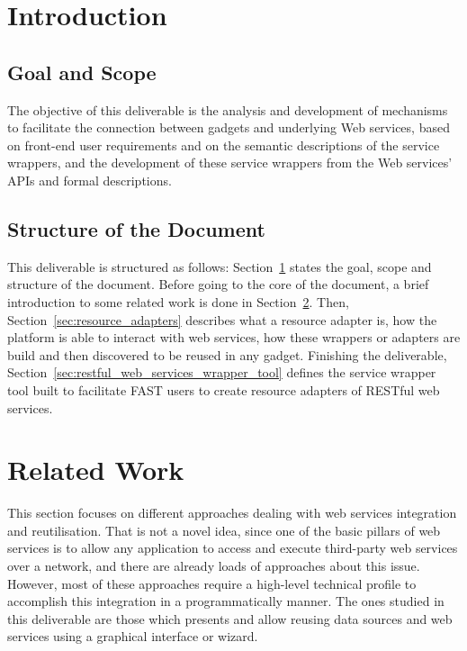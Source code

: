 \documentclass{fast_latex}
\begin{document}
\clearpage

\section{Introduction} %
\label{sec:introduction}

\subsection{Goal and Scope} %
\label{sub:goal_and_scope}

The objective of this deliverable is the analysis and development of mechanisms to facilitate the connection between gadgets and underlying Web services, based on front-end user requirements and on the semantic descriptions of the service wrappers, and the development of these service wrappers from the Web services' APIs and formal descriptions.


\subsection{Structure of the Document} %
\label{sub:structure_of_the_document}

This deliverable is structured as follows: Section~\ref{sec:introduction} states the goal, scope and structure of the document. Before going to the core of the document, a brief introduction to some related work is done in Section~\ref{sec:related_work}. Then, Section~\ref{sec:resource_adapters} describes what a resource adapter is, how the platform is able to interact with web services, how these wrappers or adapters are build and then discovered to be reused in any gadget. Finishing the deliverable, Section~\ref{sec:restful_web_services_wrapper_tool} defines the service wrapper tool built to facilitate FAST users to create resource adapters of RESTful web services.



\clearpage
\section{Related Work} %
\label{sec:related_work}

This section focuses on different approaches dealing with web services integration and reutilisation. That is not a novel idea, since one of the basic pillars of web services is to allow any application to access and execute third-party web services over a network, and there are already loads of approaches about this issue. However, most of these approaches require a high-level technical profile to accomplish this integration in a programmatically manner. The ones studied in this deliverable are those which presents and allow reusing data sources and web services using a graphical interface or wizard.
\end{document}
